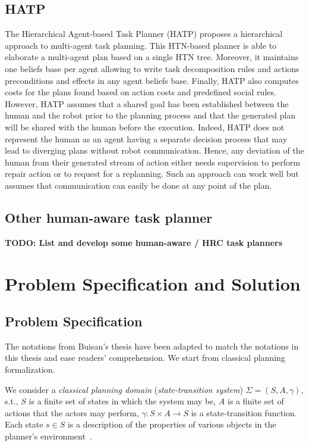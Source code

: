 \subsection{HATP}
The Hierarchical Agent-based Task Planner (HATP) proposes a hierarchical approach to multi-agent task planning. This HTN-based planner is able to elaborate a multi-agent plan based on a single HTN tree. Moreover, it maintains one beliefs base per agent allowing to write task decomposition rules and actions preconditions and effects in any agent beliefs base. Finally, HATP also computes costs for the plans found based on action costs and predefined social rules. However, HATP assumes that a shared goal has been established between the human and the robot prior to the planning process and that the generated plan will be shared with the human before the execution. Indeed, HATP does not represent the human as an agent having a separate decision process that may lead to diverging plans without robot communication. Hence, any deviation of the human from their generated stream of action either needs supervision to perform repair action or to request for a replanning. Such an approach can work well but assumes that communication can easily be done at any point of the plan.  

\subsection{Other human-aware task planner}

\textbf{TODO: List and develop some human-aware / HRC task planners}

\section{Problem Specification and Solution}

\subsection{Problem Specification}

The notations from Buisan's thesis have been adapted to match the notations in this thesis and ease readers' comprehension. We start from classical planning formalization.

We consider a \textit{classical planning domain} (\textit{state-transition system}) $\Sigma = (S, A,\gamma)$, s.t., $S$ is a finite set of states in which the system may be, $A$ is a finite set of actions that the actors may perform, $\gamma: S \times A \rightarrow S$ is a state-transition function. Each state $s \in S$ is a description of the properties of various objects in the planner's environment~\cite{naubooks0014222}. 

